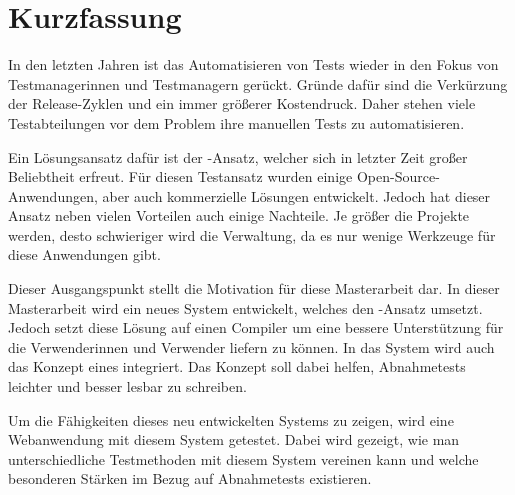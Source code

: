 \chapter{Kurzfassung}

In den letzten Jahren ist das Automatisieren von Tests wieder in den Fokus von Testmanagerinnen und Testmanagern gerückt. Gründe dafür sind die Verkürzung der Release-Zyklen und ein immer größerer Kostendruck. Daher stehen viele Testabteilungen vor dem Problem ihre manuellen Tests zu automatisieren.

\SuperPar
Ein Lösungsansatz dafür ist der -Ansatz, welcher sich in letzter Zeit großer Beliebtheit erfreut. Für diesen Testansatz wurden einige Open-Source-Anwendungen, aber auch kommerzielle Lösungen entwickelt. Jedoch hat dieser Ansatz neben vielen Vorteilen auch einige Nachteile. Je größer die Projekte werden, desto schwieriger wird die Verwaltung, da es nur wenige Werkzeuge für diese Anwendungen gibt. 

\SuperPar
Dieser Ausgangspunkt stellt die Motivation für diese Masterarbeit dar. In dieser Masterarbeit wird ein neues System entwickelt, welches den -Ansatz umsetzt. Jedoch setzt diese Lösung auf einen Compiler um eine bessere Unterstützung für die Verwenderinnen und Verwender liefern zu können. In das System wird auch das Konzept eines  integriert. Das Konzept soll dabei helfen, Abnahmetests leichter und besser lesbar zu schreiben.

\SuperPar
Um die Fähigkeiten dieses neu entwickelten Systems zu zeigen, wird eine Webanwendung mit diesem System getestet. Dabei wird gezeigt, wie man unterschiedliche Testmethoden mit diesem System vereinen kann und welche besonderen Stärken im Bezug auf Abnahmetests existieren.